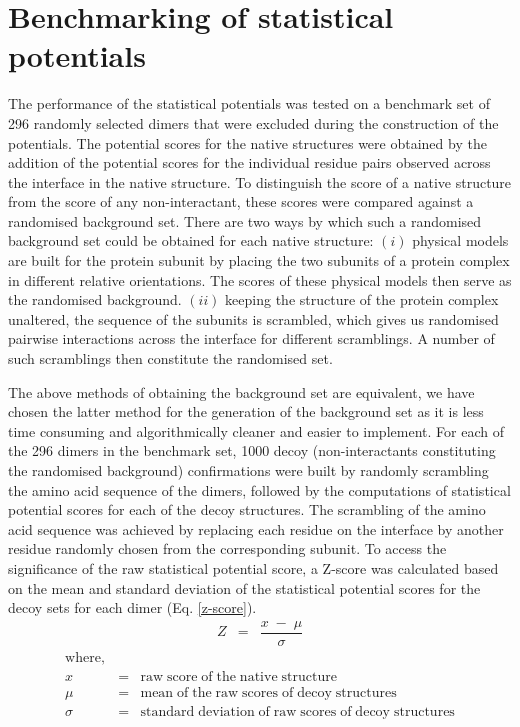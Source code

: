 \section{Benchmarking of statistical potentials}
The performance of the statistical potentials was tested on a benchmark set of 296 randomly selected dimers that were excluded during the construction of the potentials. 
The potential scores for the native structures were obtained by the addition of the potential scores for the individual residue pairs observed across the interface in the native structure. To distinguish the score of a native structure from the score of any non-interactant, these scores were compared against a randomised background set. There are two ways by which such a randomised background set could be obtained for each native structure: $(i)$ physical models are built for the protein subunit by placing the two subunits of a protein complex in different relative orientations. The scores of these physical models then serve as the randomised background. $(ii)$ keeping the structure of the protein complex unaltered, the sequence of the subunits is scrambled, which gives us randomised pairwise interactions across the interface for different scramblings. A number of such scramblings then constitute the randomised set.  
\par
The above methods of obtaining the background set are equivalent, we have chosen the latter method for the generation of the background set as it is less time consuming and algorithmically cleaner and easier to implement. For each of the 296 dimers in the benchmark set, 1000 decoy (non-interactants constituting the randomised background) confirmations were built by randomly scrambling the amino acid sequence of the dimers, followed by the computations of statistical potential scores for each of the decoy structures. The scrambling of the amino acid sequence was achieved by replacing each residue on the interface by another residue randomly chosen from the corresponding subunit. To access the significance of the raw statistical potential score, a Z-score was calculated based on the mean and standard deviation of the statistical potential scores for the decoy sets for each dimer (Eq. \ref{z-score}).
\vspace{1cm}
\begingroup
\large
\setlength\abovedisplayskip{0pt}
\begin{eqnarray}
Z &=& \dfrac{x\;-\;\mu}{\sigma}
\label{z-score}
\end{eqnarray}
\endgroup
\begingroup
\setlength{\abovedisplayskip}{0pt}
\begin{eqnarray}
\nonumber \mathrm{where,} \\
x &=& \mathrm{raw\;score\;of\;the\;native\;structure} \nonumber \\
\mu &=& \mathrm{mean\;of\;the\;raw\;scores\;of\;decoy\;structures} \nonumber \\
\sigma &=& \mathrm{standard\;deviation\;of\;raw\;scores\;of\;decoy\;structures} \nonumber
\end{eqnarray}
